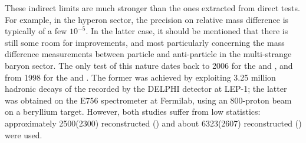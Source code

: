 These indirect limits are much stronger than the ones extracted from direct tests. For example, in the hyperon sector, the precision on relative mass difference is typically of a few $10^{-5}$. In the latter case, it should be mentioned that there is still some room for improvements, and most particularly concerning the mass difference measurements between particle and anti-particle in the multi-strange baryon sector. The only test of this nature dates back to 2006 \cite{abdallahMassesLifetimesProduction2006} for the \rmXiM and \rmAxiP, and from 1998 \cite{chanMeasurementPropertiesOverline1998} for the \rmOmegaM and \rmAomegaP. The former was achieved by exploiting 3.25 million hadronic decays of the \rmZzero recorded by the DELPHI detector at LEP-1; the latter was obtained on the E756 spectrometer at Fermilab, using an 800-\gmom proton beam on a beryllium target. However, both studies suffer from low statistics: approximately 2500(2300) reconstructed \rmXiM (\rmAxiP) and about 6323(2607) reconstructed \rmOmegaM (\rmAomegaP) were used.\\

